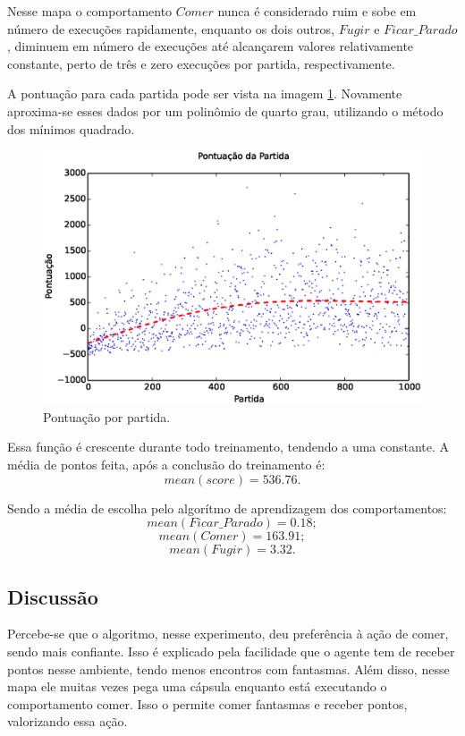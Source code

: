 Nesse mapa o comportamento $ Comer $ nunca é considerado ruim e sobe em número de execuções rapidamente, enquanto os dois outros, $ Fugir $ e $ Ficar\_Parado $, diminuem em número de execuções até alcançarem valores relativamente constante, perto de três e zero execuções por partida, respectivamente.

A pontuação para cada partida pode ser vista na imagem \ref{img:3ComportamentosMapaOriginal:PontuacaoPorPartida}. Novamente aproxima-se esses dados por um polinômio de quarto grau, utilizando o método dos mínimos quadrado.

\begin{figure}[h]
    \centering
    \includegraphics[width=\linewidth]{images/3_behaviors_original_map/match_scores____pol}
    \caption{Pontuação por partida.}
    \label{img:3ComportamentosMapaOriginal:PontuacaoPorPartida}
\end{figure}

Essa função é crescente durante todo treinamento, tendendo a uma constante. A média de pontos feita, após a conclusão do treinamento é:
$$ mean \left( score \right) = 536.76. $$

Sendo a média de escolha pelo algorítmo de aprendizagem dos comportamentos:
$$ mean \left( Ficar\_Parado \right) = 0.18; $$
$$ mean \left( Comer \right) = 163.91; $$
$$ mean \left( Fugir \right) = 3.32. $$


\subsection{Discussão}

Percebe-se que o algoritmo, nesse experimento, deu preferência à ação de comer, sendo mais confiante. Isso é explicado pela facilidade que o agente tem de receber pontos nesse ambiente, tendo menos encontros com fantasmas. Além disso, nesse mapa ele muitas vezes pega uma cápsula enquanto está executando o comportamento comer. Isso o permite comer fantasmas e receber pontos, valorizando essa ação.


